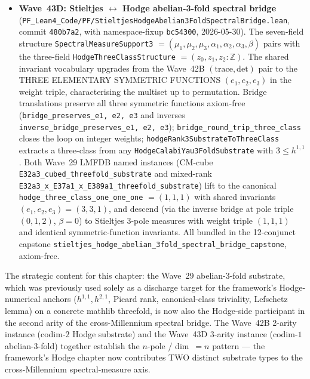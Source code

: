 \begin{remark}
\begin{itemize}
  \item \textbf{Wave~43D: Stieltjes $\leftrightarrow$ Hodge abelian-3-fold spectral bridge} (\texttt{PF\_Lean4\_Code/PF/StieltjesHodgeAbelian3FoldSpectralBridge.lean}, commit \texttt{480b7a2}, with namespace-fixup \texttt{bc54300}, 2026-05-30). The seven-field structure \texttt{SpectralMeasureSupport3} $= (\mu_1, \mu_2, \mu_3, \alpha_1, \alpha_2, \alpha_3, \beta)$ pairs with the three-field \texttt{HodgeThreeClassStructure} $= (z_0, z_1, z_2 : \mathbb{Z})$. The shared invariant vocabulary upgrades from the Wave~42B $(\mathrm{trace}, \mathrm{det})$ pair to the THREE ELEMENTARY SYMMETRIC FUNCTIONS $(e_1, e_2, e_3)$ in the weight triple, characterising the multiset up to permutation. Bridge translations preserve all three symmetric functions axiom-free (\texttt{bridge\_preserves\_e1,~e2,~e3} and inverses \texttt{inverse\_bridge\_preserves\_e1,~e2,~e3}); \texttt{bridge\_round\_trip\_three\_class} closes the loop on integer weights; \texttt{hodgeRank3SubstrateToThreeClass} extracts a three-class from any \texttt{HodgeCalabiYau3FoldSubstrate} with $3 \leq h^{1,1}$. Both Wave~29 LMFDB named instances (CM-cube \texttt{E32a3\_cubed\_threefold\_substrate} and mixed-rank \texttt{E32a3\_x\_E37a1\_x\_E389a1\_threefold\_substrate}) lift to the canonical \texttt{hodge\_three\_class\_one\_one\_one} $= (1, 1, 1)$ with shared invariants $(e_1, e_2, e_3) = (3, 3, 1)$, and descend (via the inverse bridge at pole triple $(0, 1, 2)$, $\beta = 0$) to Stieltjes 3-pole measures with weight triple $(1, 1, 1)$ and identical symmetric-function invariants. All bundled in the 12-conjunct capstone \texttt{stieltjes\_hodge\_abelian\_3fold\_spectral\_bridge\_capstone}, axiom-free.
\end{itemize}
The strategic content for this chapter: the Wave~29 abelian-3-fold substrate, which was previously used solely as a discharge target for the framework's Hodge-numerical anchors ($h^{1,1}, h^{2,1}$, Picard rank, canonical-class triviality, Lefschetz lemma) on a concrete mathlib threefold, is now also the Hodge-side participant in the second arity of the cross-Millennium spectral bridge. The Wave~42B 2-arity instance (codim-$2$ Hodge substrate) and the Wave~43D 3-arity instance (codim-$1$ abelian-3-fold) together establish the $n$-pole / dim~$=n$ pattern --- the framework's Hodge chapter now contributes TWO distinct substrate types to the cross-Millennium spectral-measure axis.


\end{remark}
